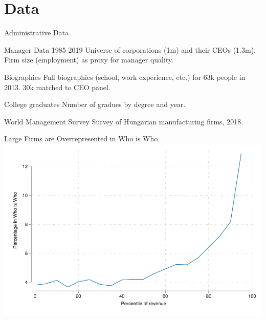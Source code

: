 \documentclass[
  ignorenonframetext,
  aspectratio=1610,
]{beamer}
\begin{document}
\section{Data}\label{data}

\begin{frame}{Administrative Data}
\protect\hypertarget{administrative-data}{}
\begin{block}{Manager Data 1985-2019}
\protect\hypertarget{manager-data-1985-2019}{}
Universe of corporations (1m) and their CEOs (1.3m). Firm size
(employment) as proxy for manager quality.
\end{block}

\begin{block}{Biographies}
\protect\hypertarget{biographies}{}
Full biographies (school, work experience, etc.) for 63k people in 2013.
30k matched to CEO panel.
\end{block}

\begin{block}{College graduates}
\protect\hypertarget{college-graduates}{}
Number of gradues by degree and year.
\end{block}

\begin{block}{World Management Survey}
\protect\hypertarget{world-management-survey}{}
Survey of Hungarian manufacturing firms, 2018.
\end{block}
\end{frame}

\begin{frame}{Large Firms are Overrepresented in Who is Who}
\protect\hypertarget{large-firms-are-overrepresented-in-who-is-who}{}
\includegraphics{fig/firm-wiw.png}
\end{frame}
\end{document}
